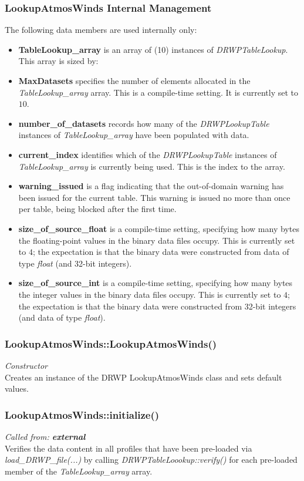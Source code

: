 \documentclass[11pt,fleqn]{report}
\begin{document}
\subsubsection{LookupAtmosWinds Internal Management}
The following data members are used internally only:
\begin{itemize}
\item \textbf{TableLookup\_array} is an array of (10) instances of
\textit{DRWPTableLookup}. This array is sized by:
\item \textbf{MaxDatasets} specifies the number of elements allocated in the
  \textit{TableLookup\_array} array. This is a compile-time setting. It is
  currently set to $10$.
\item \textbf{number\_of\_datasets} records how many of the
  \textit{DRWPLookupTable} instances of \textit{TableLookup\_array} have
  been populated with data.
\item \textbf{current\_index} identifies which of the
  \textit{DRWPLookupTable} instances of \textit{TableLookup\_array} is
  currently being used. This is the index to the array.
\item \textbf{warning\_issued} is a flag indicating that the out-of-domain
  warning has been issued for the current table. This warning is issued no
  more than once per table, being blocked after the first time.
\item \textbf{size\_of\_source\_float} is a compile-time setting, specifying
  how many bytes the floating-point values in the binary data files occupy.
  This is currently set to $4$; the expectation is that the binary data were
  constructed from data of type \textit{float} (and 32-bit integers).
\item \textbf{size\_of\_source\_int} is a compile-time setting, specifying
  how many bytes the integer values in the binary data files occupy.
  This is currently set to $4$; the expectation is that the binary data were
  constructed from 32-bit integers (and data of type \textit{float}).
\end{itemize}


\subsubsection{LookupAtmosWinds::LookupAtmosWinds()}
\textit{Constructor}\\
Creates an instance of the DRWP LookupAtmosWinds class and sets default values.

\subsubsection{LookupAtmosWinds::initialize()}
\textit{Called from: \textbf{external}}\\
Verifies the data content in all profiles that have been
pre-loaded via \textit{load\_DRWP\_file(...)} by calling
\textit{DRWPTableLoookup::verify()} for each pre-loaded member of the
\textit{TableLookup\_array} array.
\end{document}
